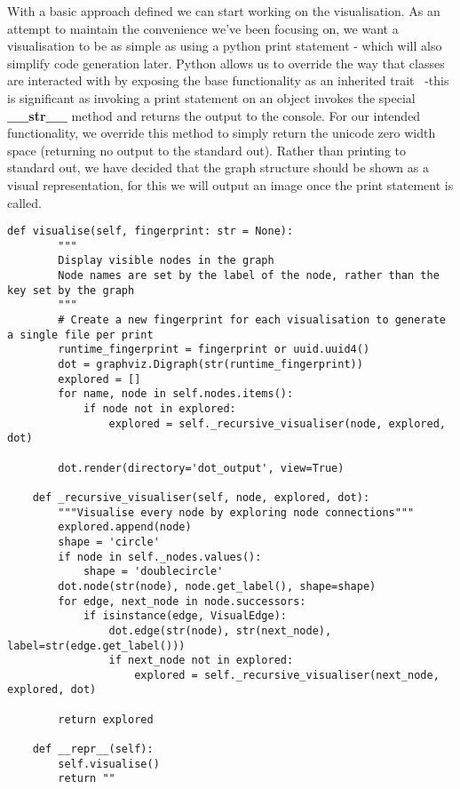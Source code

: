 With a basic approach defined we can start working on the visualisation.
As an attempt to maintain the convenience we've been focusing on, we want a visualisation to be as simple as using a
python print statement - which will also simplify code generation later.
Python allows us to override the way that classes are interacted with by exposing the base functionality as an
inherited trait~\cite{PythonDunder} -this is significant as invoking a print statement on an object invokes the special
\textbf{\_\_str\_\_} method and returns the output to the console.
For our intended functionality, we override this method to simply return the unicode zero width space (returning no
output to the standard out).
Rather than printing to standard out, we have decided that the graph structure should be shown as a visual
representation, for this we will output an image once the print statement is called.


\begin{lstlisting}[caption={Visualising graphs},captionpos=b,label={lst:python-visualise-graph}]
    def visualise(self, fingerprint: str = None):
        """
        Display visible nodes in the graph
        Node names are set by the label of the node, rather than the key set by the graph
        """
        # Create a new fingerprint for each visualisation to generate a single file per print
        runtime_fingerprint = fingerprint or uuid.uuid4()
        dot = graphviz.Digraph(str(runtime_fingerprint))
        explored = []
        for name, node in self.nodes.items():
            if node not in explored:
                explored = self._recursive_visualiser(node, explored, dot)

        dot.render(directory='dot_output', view=True)

    def _recursive_visualiser(self, node, explored, dot):
        """Visualise every node by exploring node connections"""
        explored.append(node)
        shape = 'circle'
        if node in self._nodes.values():
            shape = 'doublecircle'
        dot.node(str(node), node.get_label(), shape=shape)
        for edge, next_node in node.successors:
            if isinstance(edge, VisualEdge):
                dot.edge(str(node), str(next_node), label=str(edge.get_label()))
                if next_node not in explored:
                    explored = self._recursive_visualiser(next_node, explored, dot)

        return explored

    def __repr__(self):
        self.visualise()
        return "​"
\end{lstlisting}

